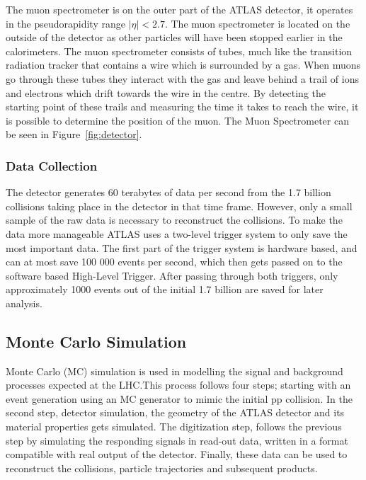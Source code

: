 \documentclass[12pt,a4paper]{article}
\numberwithin{equation}{section}
\begin{document}
The muon spectrometer is on the outer part of the ATLAS detector, it operates in
the pseudorapidity range $|\eta| < 2.7$. The muon spectrometer is located on the
outside of the detector as other particles will have been stopped earlier in the
calorimeters. The muon spectrometer consists of tubes, much like the transition
radiation tracker that contains a wire which is surrounded by a gas. When muons
go through these tubes they interact with the gas and leave behind a trail of
ions and electrons which drift towards the wire in the centre. By detecting the
starting point of these trails and measuring the time it takes to reach the
wire, it is possible to determine the position of the muon. The Muon
Spectrometer can be seen in Figure~\ref{fig:detector}.\cite{ATLAS-Muon}


\subsubsection{Data Collection}
The detector generates 60 terabytes of data per second from the 1.7 billion
collisions taking place in the detector in that time frame. However, only a
small sample of the raw data is necessary to reconstruct the collisions. To make
the data more manageable ATLAS uses a two-level trigger system to only save the
most important data. The first part of the trigger system is hardware based, and
can at most save 100 000 events per second, which then gets passed on to the
software based High-Level Trigger. After passing through both triggers, only
approximately 1000 events out of the initial 1.7 billion are saved for later
analysis.\cite{ATLAS-trig}


\subsection{Monte Carlo Simulation}
Monte Carlo (MC) simulation is used in modelling the signal and background
processes expected at the LHC.\@ This process follows four steps; starting with
an event generation using an MC generator to mimic the initial pp collision. In
the second step, detector simulation, the geometry of the ATLAS detector and its
material properties gets simulated. The digitization step, follows the previous
step by simulating the responding signals in read-out data, written in a format
compatible with real output of the detector. Finally, these data can be used to
reconstruct the collisions, particle trajectories and subsequent
products.\\
\end{document}
